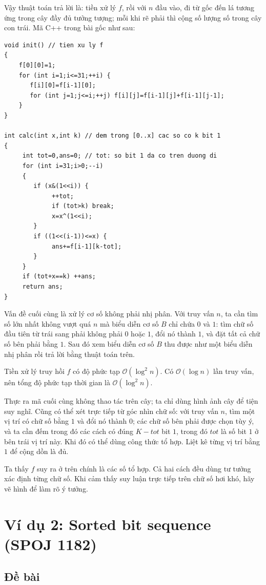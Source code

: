 \documentclass[11pt]{article}
\newcommand{\Oh}{\mathcal{O}}
\begin{document}
Vậy thuật toán trả lời là: tiền xử lý $f$, rồi với $n$ đầu vào, đi từ gốc đến
lá tương ứng trong cây đầy đủ tưởng tượng; mỗi khi rẽ phải thì cộng số lượng
số trong cây con trái. Mã C++ trong bài gốc như sau:

\begin{verbatim}
void init() // tien xu ly f
{
    f[0][0]=1;
    for (int i=1;i<=31;++i) {
       f[i][0]=f[i-1][0];
       for (int j=1;j<=i;++j) f[i][j]=f[i-1][j]+f[i-1][j-1];
    }
}

int calc(int x,int k) // dem trong [0..x] cac so co k bit 1
{
     int tot=0,ans=0; // tot: so bit 1 da co tren duong di
     for (int i=31;i>0;--i)
     {
        if (x&(1<<i)) {
             ++tot;
             if (tot>k) break;
             x=x^(1<<i);
        }
        if ((1<<(i-1))<=x) {
             ans+=f[i-1][k-tot];
        }
     }
     if (tot+x==k) ++ans;
     return ans;
}
\end{verbatim}

Vấn đề cuối cùng là xử lý cơ số không phải nhị phân. Với truy vấn $n$, ta cần
tìm số lớn nhất không vượt quá $n$ mà biểu diễn cơ số $B$ chỉ chứa $0$ và $1$:
tìm chữ số đầu tiên từ trái sang phải không phải $0$ hoặc $1$, đổi nó thành
$1$, và đặt tất cả chữ số bên phải bằng $1$. Sau đó xem biểu diễn cơ số $B$ thu
được như một biểu diễn nhị phân rồi trả lời bằng thuật toán trên.

Tiền xử lý truy hồi $f$ có độ phức tạp $\Oh(\log^2 n)$. Có $\Oh(\log n)$ lần
truy vấn, nên tổng độ phức tạp thời gian là $\Oh(\log^2 n)$.

Thực ra mã cuối cùng không thao tác trên cây; ta chỉ dùng hình ảnh cây để tiện
suy nghĩ. Cũng có thể xét trực tiếp từ góc nhìn chữ số: với truy vấn $n$, tìm
một vị trí có chữ số bằng $1$ và đổi nó thành $0$; các chữ số bên phải được
chọn tùy ý, và ta cần đếm trong đó các cách có đúng $K-\mathit{tot}$ bit $1$,
trong đó $\mathit{tot}$ là số bit $1$ ở bên trái vị trí này. Khi đó có thể dùng
công thức tổ hợp. Liệt kê từng vị trí bằng $1$ để cộng dồn là đủ.

Ta thấy $f$ suy ra ở trên chính là các số tổ hợp. Cả hai cách đều dùng tư
tưởng xác định từng chữ số. Khi cảm thấy suy luận trực tiếp trên chữ số hơi
khó, hãy vẽ hình để làm rõ ý tưởng.

\section{Ví dụ 2: Sorted bit sequence (SPOJ 1182)}

\subsection{Đề bài}
\end{document}

